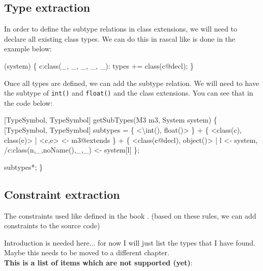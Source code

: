 \documentclass[../main.tex]{subfiles}
\begin{document}
    \subsection{Type extraction}
    In order to define the subtype relations in class extensions, we will need to declare all existing class types.
    We can do this in rascal like is done in the example below:
    \begin{rascal}
 (system) \{{}
     c:class(\_{}, \_{}, \_{}, \_{}, \_{}): types += class(c@decl);
\}{}
    \end{rascal}
    Once all types are defined, we can add the subtype relation. We will need to have the subtype of \texttt{int()} and \texttt{float()} and the class extensions.
    You can see that in the code below:
    \begin{rascal}
 [TypeSymbol, TypeSymbol] getSubTypes(M3 m3, System system) 
\{{}
    [TypeSymbol, TypeSymbol] subtypes
        = \{{} \textless{}\textbackslash{}int(), float()\textgreater{} \}{} 
        + \{{} \textless{}class(c), class(e)\textgreater{} | \textless{}c,e\textgreater{} \textless{}- m3@extends \}{}
        + \{{} \textless{}class(c@decl), object()\textgreater{} | l \textless{}- system, /c:class(n,\_{},noName(),\_{},\_{}) \textless{}- system{}[l] \}{};
        
     subtypes*;        
\}{}
    \end{rascal}
  
    \subsection{Constraint extraction}
    The constraints used like defined in the book \cite{Pal:94}.
    (based on these rules, we can add constraints to the source code)
       
    Introduction is needed here... for now I will just list the types that I have found.
    Maybe this needs to be moved to a different chapter.
    \\
    \textbf{This is a list of items which are not supported (yet)}:
\end{document}
